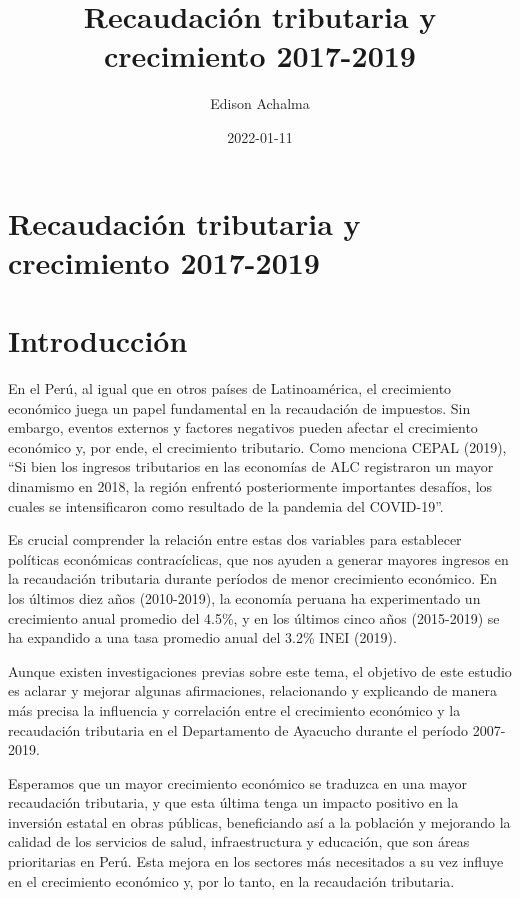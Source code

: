\documentclass[
  jou,
  floatsintext,
  longtable,
  a4paper,
  nolmodern,
  notxfonts,
  notimes,
  12pt,
  colorlinks=true,linkcolor=blue,citecolor=blue,urlcolor=blue]{apa7}
\title{Recaudación tributaria y crecimiento 2017-2019}
\author{Edison Achalma}
\affiliation{
{Escuela Profesional de Economía, Universidad Nacional de San Cristóbal
de Huamanga}}
\date{2022-01-11}
\begin{document}
\maketitle


\hypertarget{toc}{}
\tableofcontents
\newpage
\section[Introduction]{Recaudación tributaria y crecimiento 2017-2019}

\setcounter{secnumdepth}{3}

\setlength\LTleft{0pt}




\section*{Introducción}\label{sec-introducciuxf3n}

En el Perú, al igual que en otros países de Latinoamérica, el
crecimiento económico juega un papel fundamental en la recaudación de
impuestos. Sin embargo, eventos externos y factores negativos pueden
afectar el crecimiento económico y, por ende, el crecimiento tributario.
Como menciona CEPAL (2019), ``Si bien los ingresos tributarios en las
economías de ALC registraron un mayor dinamismo en 2018, la región
enfrentó posteriormente importantes desafíos, los cuales se
intensificaron como resultado de la pandemia del COVID-19''.

Es crucial comprender la relación entre estas dos variables para
establecer políticas económicas contracíclicas, que nos ayuden a generar
mayores ingresos en la recaudación tributaria durante períodos de menor
crecimiento económico. En los últimos diez años (2010-2019), la economía
peruana ha experimentado un crecimiento anual promedio del 4.5\%, y en
los últimos cinco años (2015-2019) se ha expandido a una tasa promedio
anual del 3.2\% INEI (2019).

Aunque existen investigaciones previas sobre este tema, el objetivo de
este estudio es aclarar y mejorar algunas afirmaciones, relacionando y
explicando de manera más precisa la influencia y correlación entre el
crecimiento económico y la recaudación tributaria en el Departamento de
Ayacucho durante el período 2007-2019.

Esperamos que un mayor crecimiento económico se traduzca en una mayor
recaudación tributaria, y que esta última tenga un impacto positivo en
la inversión estatal en obras públicas, beneficiando así a la población
y mejorando la calidad de los servicios de salud, infraestructura y
educación, que son áreas prioritarias en Perú. Esta mejora en los
sectores más necesitados a su vez influye en el crecimiento económico y,
por lo tanto, en la recaudación tributaria.
\end{document}
